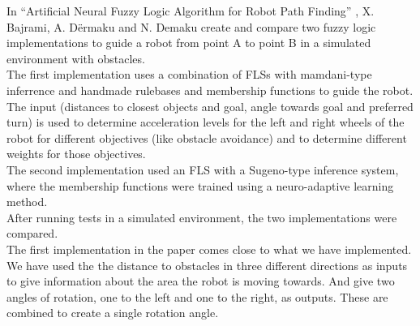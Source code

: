 \documentclass[conference]{IEEEtran}
\begin{document}
In ``Artificial Neural Fuzzy Logic Algorithm for Robot Path Finding'' \cite{bajrami2015artificial}, X. Bajrami, A. D\"ermaku and N. Demaku create and compare two fuzzy logic implementations to guide a robot from point A to point B in a simulated environment with obstacles.\\
The first implementation uses a combination of FLSs with mamdani-type inferrence and handmade rulebases and membership functions to guide the robot. The input (distances to closest objects and goal, angle towards goal and preferred turn) is used to determine acceleration levels for the left and right wheels of the robot for different objectives (like obstacle avoidance) and to determine different weights for those objectives.\\
The second implementation used an FLS with a Sugeno-type inference system, where the membership functions were trained using a neuro-adaptive learning method.\\
After running tests in a simulated environment, the two implementations were compared.\\
The first implementation in the paper comes close to what we have implemented. We have used the the distance to obstacles in three different directions as inputs to give information about the area the robot is moving towards. And give two angles of rotation, one to the left and one to the right, as outputs. These are combined to create a single rotation angle.
\end{document}
